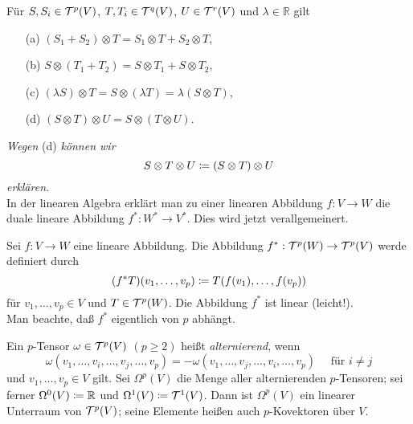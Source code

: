 \documentclass[a4paper,twoside,DIV15,BCOR12mm]{scrbook}
\begin{document}
\bigskip

\begin{satz}\label{Satz3.3.1} {Für $S, S_{i} \in {\cal T}^{p}(V)$, 
$T, T_{i} \in {\cal T}^{q}(V)$, $U \in {\cal T}^{r}(V)$ und $\lambda 
\in {\mathbb R}$ gilt}
\begin{enumerate}
\item[{\rm (a)}] $(S_{1} + S_{2}) \otimes T = S_{1} \otimes T + S_{2} \otimes T$,
\item[{\rm (b)}] $S \otimes (T_{1} + T_{2}) = S \otimes T_{1} + S \otimes T_{2}$,
\item[{\rm (c)}] $(\lambda S) \otimes T = S \otimes (\lambda T) = \lambda(S 
\otimes T)$,
\item[{\rm (d)}] $(S \otimes T) \otimes U = S \otimes (T \otimes U)$.
\end{enumerate}
\end{satz}

\noindent
{\em Wegen} (d) {\em können wir
\[ S \otimes T \otimes U \da  (S \otimes T) \otimes U \]
erklären.}\\

\noindent
In der linearen Algebra erklärt man zu einer linearen Abbildung $f: 
V \to W$ die duale lineare Abbildung $f^{*}: W^{*} \to V^{*}$. Dies 
wird jetzt verallgemeinert.

\bigskip

 Sei $f: V \to W$ eine lineare Abbildung. 
Die Abbildung $f^{*}: {\cal T}^{p}(W) \to {\cal T}^{p}(V)$ werde 
definiert durch
\[ (f^{*}T)(v_{1},\dots,v_{p}) \da  T(f(v_{1}),\dots,f(v_{p})) \]
für $v_{1},\dots,v_{p} \in V$ und $T \in {\cal T}^{p}(W)$. Die 
Abbildung $f^{*}$ ist linear (leicht!).\\

\noindent
Man beachte, daß $f^{*}$ eigentlich von $p$ abhängt.\\

\bigskip

 Ein $p$-Tensor $\omega \in {\cal 
T}^{p}(V)$ $(p \ge 2)$ heißt {\em alternierend}, wenn
\[ \omega(v_{1},\dots,v_{i},\dots,v_{j},\dots,v_{p}) = 
-\omega(v_{1},\dots,v_{j},\dots,v_{i},\dots,v_{p}) \quad \mbox{ für } 
i \not= j \]
und $v_{1},\dots,v_{p} \in V$ gilt. Sei $\Omega^{p}(V)$ die Menge 
aller alternierenden $p$-Tensoren; sei ferner $\Omega^{0}(V) \da  
{\mathbb R}$ und $\Omega^{1}(V) \da  {\cal T}^{1}(V)$. Dann ist 
$\Omega^{p}(V)$ ein linearer Unterraum von ${\cal T}^{p}(V)$; seine 
Elemente heißen auch $p$-Kovektoren über $V$.\\
\end{document}
